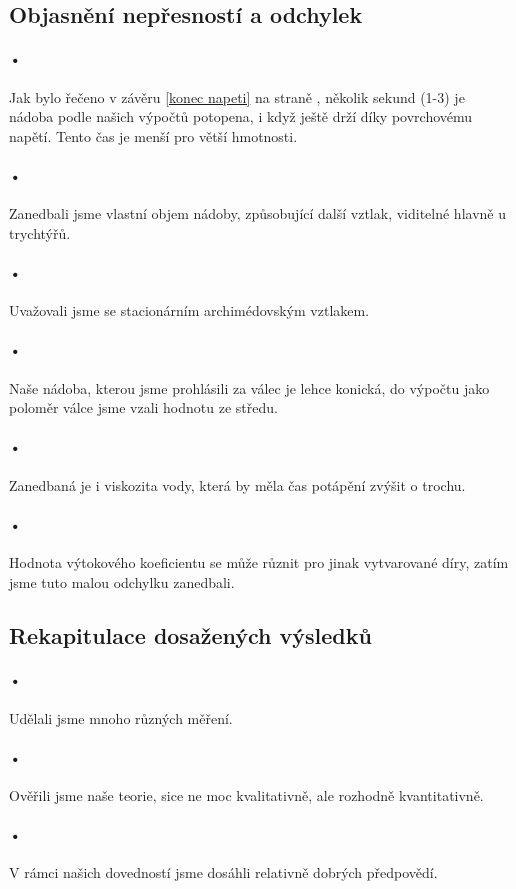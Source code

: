 \documentclass[14pt,a4paper]{article}
\begin{document}
\subsection{Objasnění nepřesností a odchylek}
\paragraph{•}Jak bylo řečeno v závěru \ref{konec napeti} na straně \pageref{konec napeti}, několik sekund (1-3) je nádoba podle našich výpočtů potopena, i když ještě drží díky povrchovému napětí. Tento čas je menší pro větší hmotnosti.
\paragraph{•}Zanedbali jsme vlastní objem nádoby, způsobující další vztlak, viditelné hlavně u trychtýřů.
\paragraph{•}Uvažovali jsme se stacionárním archimédovským vztlakem.
\paragraph{•}Naše nádoba, kterou jsme prohlásili za válec je lehce konická, do výpočtu jako poloměr válce jsme vzali hodnotu ze středu.
\paragraph{•}Zanedbaná je i viskozita vody, která by měla čas potápění zvýšit o trochu.
\paragraph{•}Hodnota výtokového koeficientu se může různit pro jinak vytvarované díry, zatím jsme tuto malou odchylku zanedbali. 
\subsection{Rekapitulace dosažených výsledků}
\paragraph{•}Udělali jsme mnoho různých měření.
\paragraph{•}Ověřili jsme naše teorie, sice ne moc kvalitativně, ale rozhodně kvantitativně.
\paragraph{•}V rámci našich dovedností jsme dosáhli relativně dobrých předpovědí.
\end{document}
